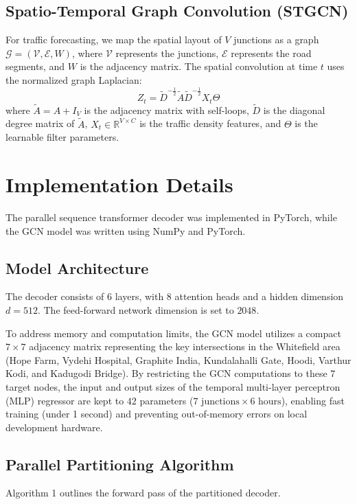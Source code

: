 \documentclass[11pt,a4paper]{article}
\begin{document}
\subsection{Spatio-Temporal Graph Convolution (STGCN)}
For traffic forecasting, we map the spatial layout of $V$ junctions as a graph $\mathcal{G} = (\mathcal{V}, \mathcal{E}, W)$, where $\mathcal{V}$ represents the junctions, $\mathcal{E}$ represents the road segments, and $W$ is the adjacency matrix. The spatial convolution at time $t$ uses the normalized graph Laplacian:
\begin{equation}
    Z_t = \tilde{D}^{-\frac{1}{2}} \tilde{A} \tilde{D}^{-\frac{1}{2}} X_t \Theta
\end{equation}
where $\tilde{A} = A + I_V$ is the adjacency matrix with self-loops, $\tilde{D}$ is the diagonal degree matrix of $\tilde{A}$, $X_t \in \mathbb{R}^{V \times C}$ is the traffic density features, and $\Theta$ is the learnable filter parameters.

\section{Implementation Details}
The parallel sequence transformer decoder was implemented in PyTorch, while the GCN model was written using NumPy and PyTorch. 

\subsection{Model Architecture}
The decoder consists of 6 layers, with 8 attention heads and a hidden dimension $d = 512$. The feed-forward network dimension is set to $2048$. 

To address memory and computation limits, the GCN model utilizes a compact $7 \times 7$ adjacency matrix representing the key intersections in the Whitefield area (Hope Farm, Vydehi Hospital, Graphite India, Kundalahalli Gate, Hoodi, Varthur Kodi, and Kadugodi Bridge). By restricting the GCN computations to these 7 target nodes, the input and output sizes of the temporal multi-layer perceptron (MLP) regressor are kept to $42$ parameters ($7 \text{ junctions} \times 6 \text{ hours}$), enabling fast training (under 1 second) and preventing out-of-memory errors on local development hardware.

\subsection{Parallel Partitioning Algorithm}
Algorithm 1 outlines the forward pass of the partitioned decoder.
\end{document}
